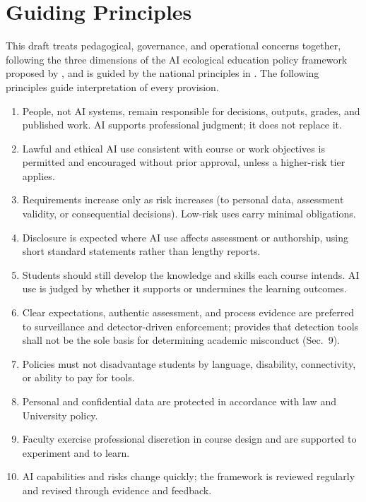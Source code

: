\section{Guiding Principles}\label{sec:principles}

This draft treats pedagogical, governance, and operational concerns together, following the three dimensions of the AI ecological education policy framework proposed by \citet{chan2023}, and is guided by the national principles in \cmo{} \citep{cmo21}. The following principles guide interpretation of every provision.

\begin{enumerate}
  \item {} People, not AI systems, remain responsible for decisions, outputs, grades, and published work. AI supports professional judgment; it does not replace it.
  \item {} Lawful and ethical AI use consistent with course or work objectives is permitted and encouraged without prior approval, unless a higher-risk tier applies.
  \item {} Requirements increase only as risk increases (to personal data, assessment validity, or consequential decisions). Low-risk uses carry minimal obligations.
  \item {} Disclosure is expected where AI use affects assessment or authorship, using short standard statements rather than lengthy reports.
  \item {} Students should still develop the knowledge and skills each course intends. AI use is judged by whether it supports or undermines the learning outcomes.
  \item {} Clear expectations, authentic assessment, and process evidence are preferred to surveillance and detector-driven enforcement; \cmo{} provides that detection tools shall not be the sole basis for determining academic misconduct (Sec.~9).
  \item {} Policies must not disadvantage students by language, disability, connectivity, or ability to pay for tools.
  \item {} Personal and confidential data are protected in accordance with law and University policy.
  \item {} Faculty exercise professional discretion in course design and are supported to experiment and to learn.
  \item {} AI capabilities and risks change quickly; the framework is reviewed regularly and revised through evidence and feedback.
\end{enumerate}
